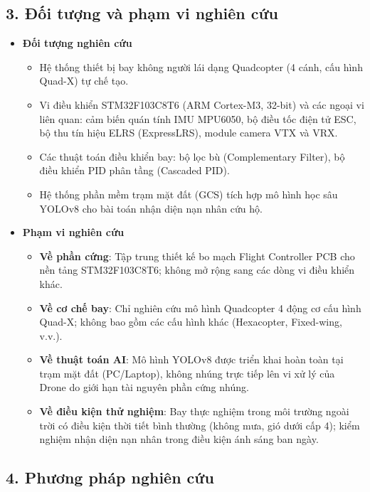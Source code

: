 \subsection*{3. Đối tượng và phạm vi nghiên cứu}

\begin{itemize}
    \item \textbf{Đối tượng nghiên cứu}
    \begin{itemize}
        \item Hệ thống thiết bị bay không người lái dạng Quadcopter (4 cánh, cấu hình Quad-X) tự chế tạo.
        \item Vi điều khiển STM32F103C8T6 (ARM Cortex-M3, 32-bit) và các ngoại vi liên quan: cảm biến quán tính IMU MPU6050, bộ điều tốc điện tử ESC, bộ thu tín hiệu ELRS (ExpressLRS), module camera VTX và VRX.
        \item Các thuật toán điều khiển bay: bộ lọc bù (Complementary Filter), bộ điều khiển PID phân tầng (Cascaded PID).
        \item Hệ thống phần mềm trạm mặt đất (GCS) tích hợp mô hình học sâu YOLOv8 cho bài toán nhận diện nạn nhân cứu hộ.
    \end{itemize}

    \item \textbf{Phạm vi nghiên cứu}
    \begin{itemize}
        \item \textbf{Về phần cứng}: Tập trung thiết kế bo mạch Flight Controller PCB cho nền tảng STM32F103C8T6; không mở rộng sang các dòng vi điều khiển khác.
        \item \textbf{Về cơ chế bay}: Chỉ nghiên cứu mô hình Quadcopter 4 động cơ cấu hình Quad-X; không bao gồm các cấu hình khác (Hexacopter, Fixed-wing, v.v.).
        \item \textbf{Về thuật toán AI}: Mô hình YOLOv8 được triển khai hoàn toàn tại trạm mặt đất (PC/Laptop), không nhúng trực tiếp lên vi xử lý của Drone do giới hạn tài nguyên phần cứng nhúng.
        \item \textbf{Về điều kiện thử nghiệm}: Bay thực nghiệm trong môi trường ngoài trời có điều kiện thời tiết bình thường (không mưa, gió dưới cấp 4); kiểm nghiệm nhận diện nạn nhân trong điều kiện ánh sáng ban ngày.
    \end{itemize}
\end{itemize}

\subsection*{4. Phương pháp nghiên cứu}

